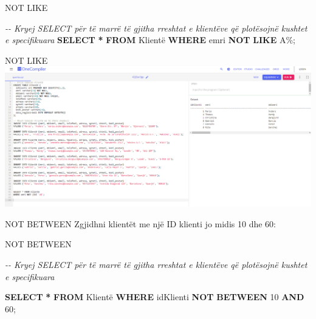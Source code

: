 \documentclass[
  ignorenonframetext,
]{beamer}
\newenvironment{Shaded}{\begin{snugshade}}{\end{snugshade}}
\newcommand{\CommentTok}[1]{\textcolor[rgb]{0.56,0.35,0.01}{\textit{#1}}}
\newcommand{\DecValTok}[1]{\textcolor[rgb]{0.00,0.00,0.81}{#1}}
\newcommand{\KeywordTok}[1]{\textcolor[rgb]{0.13,0.29,0.53}{\textbf{#1}}}
\newcommand{\NormalTok}[1]{#1}
\newcommand{\OperatorTok}[1]{\textcolor[rgb]{0.81,0.36,0.00}{\textbf{#1}}}
\newcommand{\StringTok}[1]{\textcolor[rgb]{0.31,0.60,0.02}{#1}}
\begin{document}
\begin{frame}[fragile]{NOT LIKE}
\label{not-like-1}

\begin{Shaded}
\begin{Highlighting}[]
\CommentTok{{-}{-} Kryej SELECT për të marrë të gjitha rreshtat e klientëve që plotësojnë kushtet e specifikuara}
\KeywordTok{SELECT} \OperatorTok{*} \KeywordTok{FROM}\NormalTok{ Klientë}
\KeywordTok{WHERE}\NormalTok{ emri }\KeywordTok{NOT} \KeywordTok{LIKE} \StringTok{\textquotesingle{}A\%\textquotesingle{}}\NormalTok{;}
\end{Highlighting}
\end{Shaded}
\end{frame}

\begin{frame}{NOT LIKE}
\label{not-like-2}
\includegraphics{./Figs/query23.png}
\end{frame}

\begin{frame}{NOT BETWEEN}
\label{not-between}
Zgjidhni klientët me një ID klienti jo midis 10 dhe 60:
\end{frame}

\begin{frame}[fragile]{NOT BETWEEN}
\label{not-between-1}

\begin{Shaded}
\begin{Highlighting}[]
\CommentTok{{-}{-} Kryej SELECT për të marrë të gjitha rreshtat e klientëve që plotësojnë kushtet e specifikuara}

\KeywordTok{SELECT} \OperatorTok{*} \KeywordTok{FROM}\NormalTok{ Klientë}
\KeywordTok{WHERE}\NormalTok{ idKlienti }\KeywordTok{NOT} \KeywordTok{BETWEEN} \DecValTok{10} \KeywordTok{AND} \DecValTok{60}\NormalTok{;}
\end{Highlighting}
\end{Shaded}
\end{frame}
\end{document}
